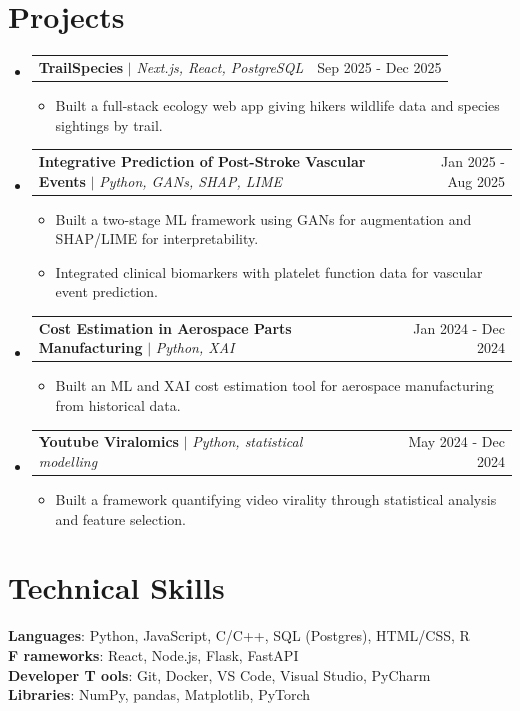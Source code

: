 \documentclass[letterpaper,11pt]{article}
\makeatletter
\newcommand{\resumeItem}[1]{
  \item\small{
    {#1 \vspace{-2pt}}
  }
}
\newcommand{\resumeProjectHeading}[2]{
    \item
    \begin{tabular*}{0.97\textwidth}{l@{\extracolsep{\fill}}r}
      \small#1 & #2 \\
    \end{tabular*}\vspace{-7pt}
}
\newcommand{\resumeSubHeadingListStart}{\begin{itemize}[leftmargin=0.15in, label={}]}
\newcommand{\resumeSubHeadingListEnd}{\end{itemize}}
\newcommand{\resumeItemListStart}{\begin{itemize}}
\newcommand{\resumeItemListEnd}{\end{itemize}\vspace{-5pt}}
\makeatother
\begin{document}
\section{Projects}
    \resumeSubHeadingListStart
      \resumeProjectHeading
        {\textbf{TrailSpecies} $|$ \emph{Next.js, React, PostgreSQL}}{Sep 2025 - Dec 2025}
      \resumeItemListStart
        \resumeItem{Built a full-stack ecology web app giving hikers wildlife data and species sightings by trail.}
      \resumeItemListEnd
      \resumeProjectHeading
        {\textbf{Integrative Prediction of Post-Stroke Vascular Events} $|$ \emph{Python, GANs, SHAP, LIME}}{Jan 2025 - Aug 2025}
      \resumeItemListStart
        \resumeItem{Built a two-stage ML framework using GANs for augmentation and SHAP/LIME for interpretability.}
        \resumeItem{Integrated clinical biomarkers with platelet function data for vascular event prediction.}
      \resumeItemListEnd
      \resumeProjectHeading
        {\textbf{Cost Estimation in Aerospace Parts Manufacturing} $|$ \emph{Python, XAI}}{Jan 2024 - Dec 2024}
      \resumeItemListStart
        \resumeItem{Built an ML and XAI cost estimation tool for aerospace manufacturing from historical data.}
      \resumeItemListEnd
      \resumeProjectHeading
        {\textbf{Youtube Viralomics} $|$ \emph{Python, statistical modelling}}{May 2024 - Dec 2024}
      \resumeItemListStart
        \resumeItem{Built a framework quantifying video virality through statistical analysis and feature selection.}
      \resumeItemListEnd
    \resumeSubHeadingListEnd

\section{Technical Skills}
  \begin{itemize}[leftmargin=0.15in, label={}]
    \small{\item{
     \textbf{Languages}{: Python, JavaScript, C/C++, SQL (Postgres), HTML/CSS, R} \\
     \textbf{F rameworks}{: React, Node.js, Flask, FastAPI} \\
     \textbf{Developer T ools}{: Git, Docker, VS Code, Visual Studio, PyCharm} \\
     \textbf{Libraries}{: NumPy, pandas, Matplotlib, PyTorch}
    }}
  \end{itemize}
\end{document}

